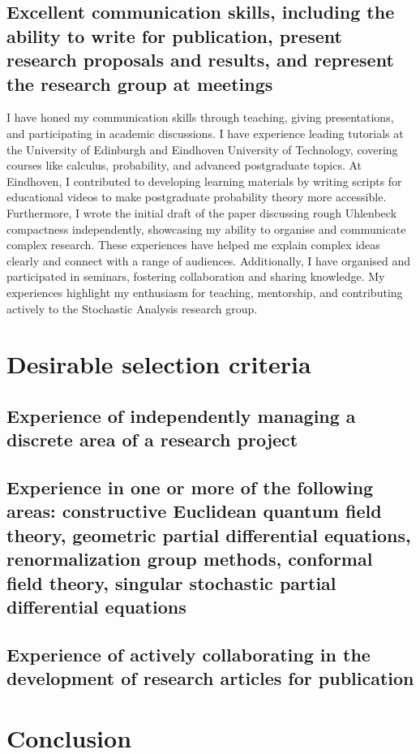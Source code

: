 \documentclass[12pt]{article}
\numberwithin{equation}{section}
\theoremstyle{definition}
\theoremstyle{remark}
\newcommand{\1}{\mathbf 1}
\newcommand{\<}{\langle}
\renewcommand{\>}{\rangle}
\begin{document}
\subsection{Excellent communication skills, including the ability to write for publication, present research proposals and results, and represent the research group at meetings}
I have honed my communication skills through teaching, giving presentations, and participating in academic discussions. I have experience leading tutorials at the University of Edinburgh and Eindhoven University of Technology, covering courses like calculus, probability, and advanced postgraduate topics. At Eindhoven, I contributed to developing learning materials by writing scripts for educational videos to make postgraduate probability theory more accessible. Furthermore, I wrote the initial draft of the paper discussing rough Uhlenbeck compactness independently, showcasing my ability to organise and communicate complex research.  These experiences have helped me explain complex ideas clearly and connect with a range of audiences. Additionally, I have organised and participated in seminars, fostering collaboration and sharing knowledge. My experiences highlight my enthusiasm for teaching, mentorship, and contributing actively to the Stochastic Analysis research group.

\section{Desirable selection criteria}
\subsection{Experience of independently managing a discrete area of a research project}


\subsection{Experience in one or more of the following areas: constructive Euclidean quantum field
theory, geometric partial differential equations, renormalization group methods,
conformal field theory, singular stochastic partial differential equations}


\subsection{Experience of actively collaborating in the development of research articles for
publication}
\section{Conclusion}
\end{document}
